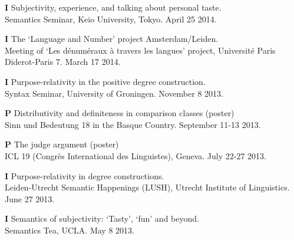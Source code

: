 \documentclass[12pt,letterpaper]{article}
\begin{document}
{\begin{hangparas}{.25in}{1}
\vspace{1mm}

\textbf{I} \hspace{2mm} Subjectivity, experience, and talking about personal taste. \\Semantics Seminar, Keio University, Tokyo. April 25 2014.

\vspace{1mm}

\textbf{I} \hspace{2mm} The `Language and Number' project Amsterdam/Leiden. \\Meeting of `Les d\'{e}num\'{e}raux \`{a} travers les langues' project, Universit\'{e} Paris Diderot-Paris 7. March 17 2014.

\vspace{1mm}

\textbf{I} \hspace{2mm} Purpose-relativity in the positive degree construction. \\Syntax Seminar, University of Groningen. November 8 2013.

\vspace{1mm}

\textbf{P} \hspace{1.2mm} Distributivity and definiteness in comparison classes (poster) \\ Sinn und Bedeutung 18 in the Basque Country. September 11-13 2013.

\vspace{1mm}

\textbf{P} \hspace{1.2mm} The judge argument (poster) \\ ICL 19 (Congr\`{e}s International des Linguistes), Geneva. July 22-27 2013. 

\vspace{1mm}

\textbf{I} \hspace{1.2mm} Purpose-relativity in degree constructions. \\ Leiden-Utrecht Semantic Happenings (LUSH), Utrecht Institute of Linguistics. June 27 2013.

\vspace{1mm}

\textbf{I} \hspace{2mm} Semantics of subjectivity: `Tasty', `fun' and beyond. \\ Semantics Tea, UCLA. May 8 2013.

\vspace{1mm}


\end{hangparas}}
\end{document}
